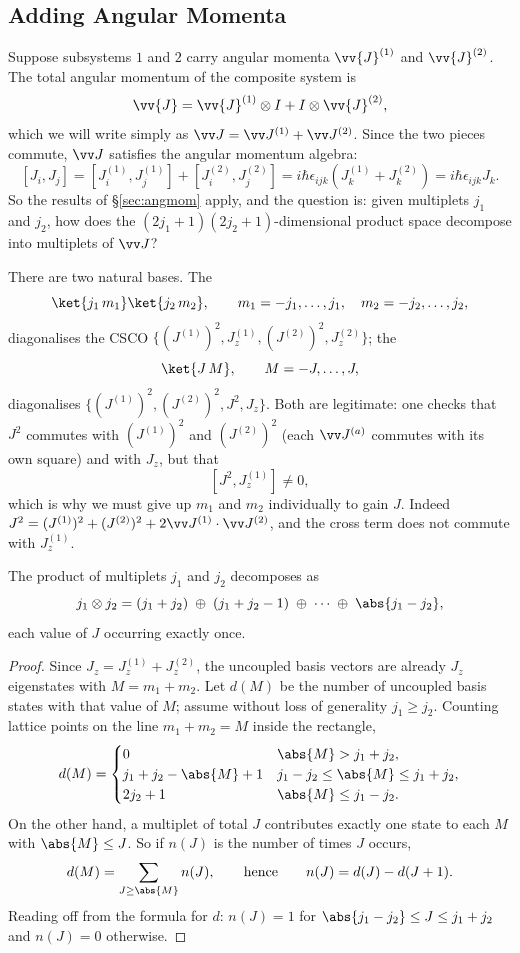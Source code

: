 \subsection{Adding Angular Momenta}

Suppose subsystems $1$ and $2$ carry angular momenta $\vv{J}^{(1)}$ and $\vv{J}^{(2)}$. The total angular momentum of the composite system is
$$
\vv{J} = \vv{J}^{(1)}\otimes I + I \otimes \vv{J}^{(2)},
$$
which we will write simply as $\vv J = \vv J^{(1)} + \vv J^{(2)}$. Since the two pieces commute, $\vv J$ satisfies the angular momentum algebra:
$$
[J_i, J_j] = [J_i^{(1)},J_j^{(1)}] + [J_i^{(2)},J_j^{(2)}] = i\hbar\epsilon_{ijk}\left( J_k^{(1)} + J_k^{(2)} \right) = i\hbar\epsilon_{ijk}J_k.
$$
So the results of \S\ref{sec:angmom} apply, and the question is: given multiplets $j_1$ and $j_2$, how does the $(2j_1+1)(2j_2+1)$-dimensional product space decompose into multiplets of $\vv J$?

There are two natural bases. The 
$$
\ket{j_1 \, m_1}\ket{j_2\,m_2}, \qquad m_1 = -j_1,\dots,j_1, \quad m_2 = -j_2,\dots,j_2,
$$
diagonalises the CSCO $\{(J^{(1)})^2, J_z^{(1)}, (J^{(2)})^2, J_z^{(2)}\}$; the 
$$
\ket{J\,M}, \qquad M = -J, \dots, J,
$$
diagonalises $\{(J^{(1)})^2, (J^{(2)})^2, J^2, J_z\}$. Both are legitimate: one checks that $J^2$ commutes with $(J^{(1)})^2$ and $(J^{(2)})^2$ (each $\vv J^{(a)}$ commutes with its own square) and with $J_z$, but that
$$
[J^2, J_z^{(1)}] \neq 0,
$$
which is why we must give up $m_1$ and $m_2$ individually to gain $J$. Indeed $J^2 = (J^{(1)})^2 + (J^{(2)})^2 + 2\vv J^{(1)}\cdot\vv J^{(2)}$, and the cross term does not commute with $J_z^{(1)}$.

\begin{theorem}
    The product of multiplets $j_1$ and $j_2$ decomposes as
    $$
    j_1 \otimes j_2 = (j_1+j_2)\;\oplus\;(j_1+j_2-1)\;\oplus\;\cdots\;\oplus\;\abs{j_1-j_2},
    $$
    each value of $J$ occurring exactly once.
\end{theorem}
\begin{proof}
    Since $J_z = J_z^{(1)}+J_z^{(2)}$, the uncoupled basis vectors are already $J_z$ eigenstates with $M = m_1+m_2$. Let $d(M)$ be the number of uncoupled basis states with that value of $M$; assume without loss of generality $j_1\geq j_2$. Counting lattice points on the line $m_1+m_2 = M$ inside the rectangle,
    $$
    d(M) = \begin{cases}
    0 & \abs{M} > j_1+j_2,\\
    j_1+j_2-\abs{M}+1 & j_1 - j_2 \leq \abs{M} \leq j_1+j_2,\\
    2j_2+1 & \abs{M} \leq j_1 - j_2.
    \end{cases}
    $$
    On the other hand, a multiplet of total $J$ contributes exactly one state to each $M$ with $\abs{M}\leq J$. So if $n(J)$ is the number of times $J$ occurs,
    $$
    d(M) = \sum_{J \geq \abs{M}} n(J), \qquad \text{hence} \qquad n(J) = d(J) - d(J+1).
    $$
    Reading off from the formula for $d$: $n(J) = 1$ for $\abs{j_1-j_2}\leq J \leq j_1+j_2$ and $n(J) = 0$ otherwise.
\end{proof}

